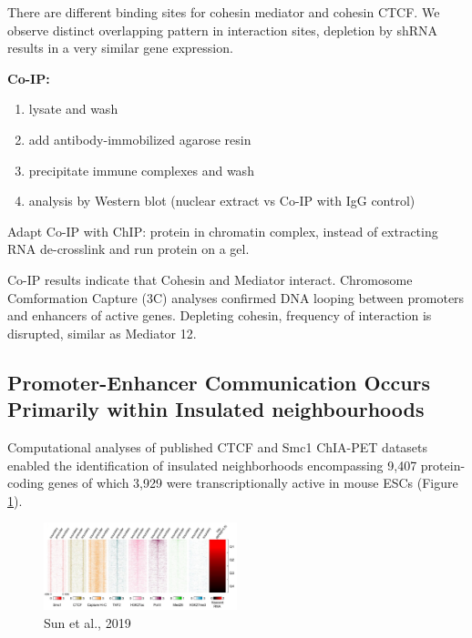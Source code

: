 There are different binding sites for cohesin mediator and cohesin CTCF. We observe distinct overlapping pattern in interaction sites, depletion by shRNA results in a very similar gene expression.

\textbf{Co-IP:}

\begin{enumerate}
\def\labelenumi{\arabic{enumi}.}
\tightlist
\item
  lysate and wash
\item
  add antibody-immobilized agarose resin
\item
  precipitate immune complexes and wash
\item
  analysis by Western blot (nuclear extract vs Co-IP with IgG control)
\end{enumerate}

Adapt Co-IP with ChIP: protein in chromatin complex, instead of extracting RNA de-crosslink and run protein on a gel.

Co-IP results indicate that Cohesin and Mediator interact. Chromosome Comformation Capture (3C) analyses confirmed DNA looping between promoters and enhancers of active genes. Depleting cohesin, frequency of interaction is disrupted, similar as Mediator 12.

\hypertarget{promoter-enhancer-communication-occurs-primarily-within-insulated-neighbourhoods}{%
\subsection{Promoter-Enhancer Communication Occurs Primarily within Insulated neighbourhoods}\label{promoter-enhancer-communication-occurs-primarily-within-insulated-neighbourhoods}}

Computational analyses of published CTCF and Smc1 ChIA-PET datasets enabled the identification of insulated neighborhoods encompassing 9,407 protein-coding genes of which 3,929 were transcriptionally active in mouse ESCs (Figure \ref{fig:mouse}).

\begin{figure}
\centering
\includegraphics[width=0.5\textwidth]{../_resources/Screenshot_2022-10-19_at_10-01-09.png}
\caption{Sun et al., 2019}
\label{fig:mouse}
\end{figure}

